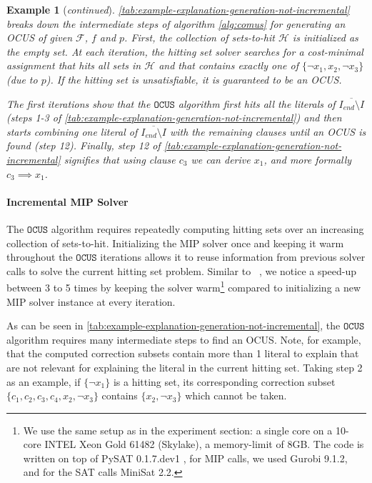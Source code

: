 \documentclass[twoside,11pt]{article}
\newcommand\citet[1]{\citeauthor{#1}~\citeyear{#1}}
\newcommand\m[1]{\mathcal{#1}}
\newtheorem{example}{Example}
\newcommand\comment[1]{\marginpar{\tiny #1}}
\renewcommand\comment[1]{#1}
\newcommand{\bart}[1]{{\comment{\color{OliveGreen}Bart: #1}}}
\newcommand\setstohit{\ensuremath{\m{H} }\xspace}
\newcommand\Iend{\ensuremath{I_\mathit{end} }\xspace}
\newcommand\formula{\ensuremath{\m{F} }\xspace}
\newcommand\mm[1]{\ensuremath{#1}\xspace}
\newcommand\call[1]{\mm{\texttt{#1}}}
\newcommand\comus{\mm{\call{OCUS}}}
\begin{document}
\begin{example}[\textit{continued}]
	\cref{tab:example-explanation-generation-not-incremental} breaks down the intermediate steps of algorithm \ref{alg:comus} for generating an OCUS of given $\formula$, $f$ and $p$. 
	First, the collection of sets-to-hit \setstohit is initialized as the empty set. At each iteration, the hitting set solver searches for a cost-minimal assignment that hits all sets in \setstohit and that contains exactly one of $\{\lnot x_1, x_2, \lnot x_3\}$ (due to $p$). If the hitting set is unsatisfiable, it is guaranteed to be an OCUS.
	
 The first iterations show that the \comus algorithm first hits all the literals of $\overline{\Iend\setminus I}$ (steps 1-3 of \cref{tab:example-explanation-generation-not-incremental}) and then starts combining one literal of $\overline{\Iend\setminus I}$ %
  with the remaining clauses until an OCUS is found (step 12). 
  Finally, step 12 of \cref{tab:example-explanation-generation-not-incremental} signifies that using clause $c_3$ we can derive $x_1$, and more formally $c_3 \implies x_1$.

\end{example}



	\paragraph{Incremental MIP Solver} The \comus algorithm requires repeatedly computing hitting sets over an increasing collection of sets-to-hit. Initializing the MIP solver once and keeping it warm throughout the \comus iterations allows it to reuse information from previous solver calls to solve the current hitting set problem. Similar to \citet{DBLP:conf/sat/DaviesB13}, we notice a speed-up between 3 to 5 times by keeping the solver warm\footnote{We use the same setup as in the experiment section: a single core on a 10-core INTEL Xeon Gold 61482 (Skylake), a memory-limit of 8GB. The code is written on top of PySAT 0.1.7.dev1 \cite{pysat}, for MIP calls, we used Gurobi 9.1.2, and for the SAT calls MiniSat 2.2.} compared to initializing a new MIP solver instance at every iteration.

	As can be seen in \cref{tab:example-explanation-generation-not-incremental}, the \comus algorithm requires many intermediate steps to find an OCUS. 
	Note, for example, that the computed correction subsets contain more than 1 literal to explain that are not relevant for explaining the literal in the current hitting set. 
	Taking step 2 as an example, if $\{\lnot x_1\}$ is a hitting set, its corresponding correction subset $ \{ c_1, c_2, c_3, c_4, x_2, \lnot x_3 \}$ contains $\{x_2, \lnot x_3\}$ which cannot be taken. 
\end{document}
